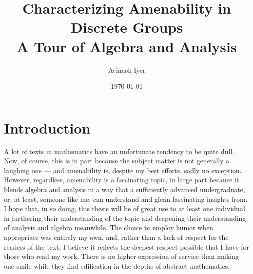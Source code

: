\documentclass[10pt]{package2}
\title{Characterizing Amenability in Discrete Groups\\{\large A Tour of Algebra and Analysis}}
\author{Avinash Iyer}
\date{\today}
\begin{document}
\maketitle
\RaggedRight
\tableofcontents
\chapter{Introduction}
A lot of texts in mathematics have an unfortunate tendency to be quite dull. Now, of course, this is in part because the subject matter is not generally a laughing one --- and amenability is, despite my best efforts, sadly no exception. However, regardless, amenability is a fascinating topic, in large part because it blends algebra and analysis in a way that a sufficiently advanced undergraduate, or, at least, someone like me, can understand and glean fascinating insights from. I hope that, in so doing, this thesis will be of great use to at least one individual in furthering their understanding of the topic and deepening their understanding of analysis and algebra meanwhile. The choice to employ humor when appropriate was entirely my own, and, rather than a lack of respect for the readers of the text, I believe it reflects the deepest respect possible that I have for those who read my work. There is no higher expression of service than making one smile while they find edification in the depths of abstract mathematics.\newline
\end{document}
